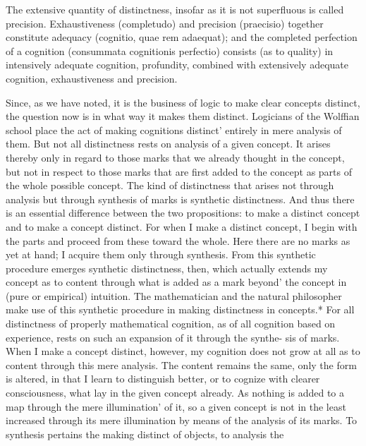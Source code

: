     The extensive quantity of distinctness,
    insofar as it is not superfluous is called precision.
    Exhaustiveness (completudo) and precision (praecisio)
    together constitute adequacy (cognitio, quae rem adaequat);
    and the completed perfection of a cognition
    (consummata cognitionis perfectio) consists (as to quality)
    in intensively adequate cognition,
    profundity, combined with extensively adequate cognition,
    exhaustiveness and precision.

    Since, as we have noted, it is the business of logic to make clear concepts
    distinct, the question now is in what way it makes them distinct.
    Logicians of the Wolffian school place the act of making cognitions
    distinct' entirely in mere analysis of them. But not all distinctness rests on
    analysis of a given concept. It arises thereby only in regard to those marks
    that we already thought in the concept, but not in respect to those marks
    that are first added to the concept as parts of the whole possible concept.
    The kind of distinctness that arises not through analysis but through
    synthesis of marks is synthetic distinctness. And thus there is an essential
    difference between the two propositions: to make a distinct concept and to
    make a concept distinct.
    For when I make a distinct concept, I begin with the parts and proceed
    from these toward the whole. Here there are no marks as yet at hand; I
    acquire them only through synthesis. From this synthetic procedure
    emerges synthetic distinctness, then, which actually extends my concept
    as to content through what is added as a mark beyond' the concept in (pure
    or empirical) intuition. The mathematician and the natural philosopher
    make use of this synthetic procedure in making distinctness in concepts.*
    For all distinctness of properly mathematical cognition, as of all cognition
    based on experience, rests on such an expansion of it through the synthe-
    sis of marks.
    When I make a concept distinct, however, my cognition does not grow
    at all as to content through this mere analysis. The content remains the
    same, only the form is altered, in that I learn to distinguish better, or to
    cognize with clearer consciousness, what lay in the given concept already.
    As nothing is added to a map through the mere illumination' of it, so a
    given concept is not in the least increased through its mere illumination
    by means of the analysis of its marks.
    To synthesis pertains the making distinct of objects, to analysis the
